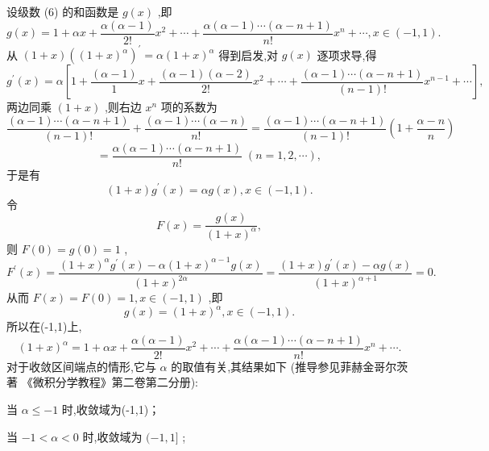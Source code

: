 设级数 (6) 的和函数是 \(g\left( x\right)\) ,即
\[
g\left( x\right)  = 1 + {\alpha x} + \frac{\alpha \left( {\alpha  - 1}\right) }{2!}{x}^{2} + \cdots  + \frac{\alpha \left( {\alpha  - 1}\right) \cdots \left( {\alpha  - n + 1}\right) }{n!}{x}^{n} + \cdots ,x \in  \left( {-1,1}\right) .
\]
从 \(\left( {1 + x}\right) {\left( {\left( 1 + x\right) }^{\alpha }\right) }^{\prime } = \alpha {\left( 1 + x\right) }^{\alpha }\) 得到启发,对 \(g\left( x\right)\) 逐项求导,得
\[
{g}^{\prime }\left( x\right)  = \alpha \left\lbrack  {1 + \frac{\left( \alpha  - 1\right) }{1}x + \frac{\left( {\alpha  - 1}\right) \left( {\alpha  - 2}\right) }{2!}{x}^{2} + \cdots  + \frac{\left( {\alpha  - 1}\right) \cdots \left( {\alpha  - n + 1}\right) }{\left( {n - 1}\right) !}{x}^{n - 1} + \cdots }\right\rbrack  ,
\]
两边同乘 \(\left( {1 + x}\right)\) ,则右边 \({x}^{n}\) 项的系数为
\[
\frac{\left( {\alpha  - 1}\right) \cdots \left( {\alpha  - n + 1}\right) }{\left( {n - 1}\right) !} + \frac{\left( {\alpha  - 1}\right) \cdots \left( {\alpha  - n}\right) }{n!} = \frac{\left( {\alpha  - 1}\right) \cdots \left( {\alpha  - n + 1}\right) }{\left( {n - 1}\right) !}\left( {1 + \frac{\alpha  - n}{n}}\right)
\]
\[
= \frac{\alpha \left( {\alpha  - 1}\right) \cdots \left( {\alpha  - n + 1}\right) }{n!}\;\left( {n = 1,2,\cdots }\right) ,
\]
于是有
\[
\left( {1 + x}\right) {g}^{\prime }\left( x\right)  = {\alpha g}\left( x\right) ,x \in  \left( {-1,1}\right) .
\]
令
\[
F\left( x\right)  = \frac{g\left( x\right) }{{\left( 1 + x\right) }^{\alpha }},
\]
则 \(F\left( 0\right)  = g\left( 0\right)  = 1\) ,
\[
{F}^{\prime }\left( x\right)  = \frac{{\left( 1 + x\right) }^{\alpha }{g}^{\prime }\left( x\right)  - \alpha {\left( 1 + x\right) }^{\alpha  - 1}g\left( x\right) }{{\left( 1 + x\right) }^{2\alpha }} = \frac{\left( {1 + x}\right) {g}^{\prime }\left( x\right)  - {\alpha g}\left( x\right) }{{\left( 1 + x\right) }^{\alpha  + 1}} = 0.
\]
从而 \(F\left( x\right)  = F\left( 0\right)  = 1,x \in  \left( {-1,1}\right)\) ,即
\[
g\left( x\right)  = {\left( 1 + x\right) }^{\alpha },x \in  \left( {-1,1}\right) .
\]
所以在(-1,1)上,
\[
{\left( 1 + x\right) }^{\alpha } = 1 + {\alpha x} + \frac{\alpha \left( {\alpha  - 1}\right) }{2!}{x}^{2} + \cdots  + \frac{\alpha \left( {\alpha  - 1}\right) \cdots \left( {\alpha  - n + 1}\right) }{n!}{x}^{n} + \cdots . \tag{7}
\]
对于收敛区间端点的情形,它与 \(\alpha\) 的取值有关,其结果如下 (推导参见菲赫金哥尔茨著 《微积分学教程》第二卷第二分册):

当 \(\alpha  \leq   - 1\) 时,收敛域为(-1,1)；

当 \(- 1 < \alpha  < 0\) 时,收敛域为 \(( - 1,1\rbrack\) ;

